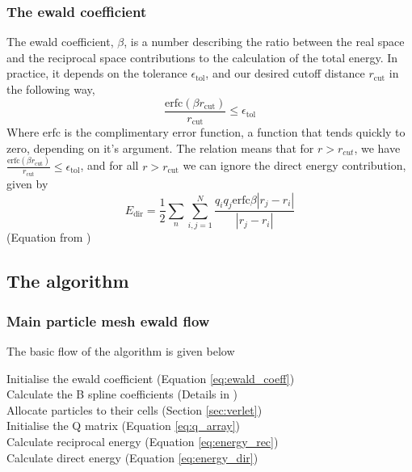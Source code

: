 \documentclass[pdftex,twoside,a4paper]{report}
\begin{document}
\subsubsection{The ewald coefficient}
The ewald coefficient, $\beta$, is a number describing the ratio between the real space and the reciprocal space contributions to the calculation of the total energy. In practice, it depends on the tolerance $\epsilon_\text{tol}$, and our desired cutoff distance $r_{\text{cut}}$ in the following way, \cite{darden:10089} \cite{essmann:8577}\\
\begin{equation}
\frac{\text{erfc}(\beta r_{\text{cut}})}{r_\text{cut}} \leq \epsilon_\text{tol}
\label{eq:ewald_coeff}
\end{equation}
Where erfc is the complimentary error function, a function that tends quickly to zero, depending on it's argument. The relation means that for $r > r_{cut}$, we have $\frac{\text{erfc}(\beta r_{\text{cut}})}{r_\text{cut}} \leq \epsilon_\text{tol}$, and for all $r > r_\text{cut}$ we can ignore the direct energy contribution, given by\\
\begin{equation}
E_\text{dir} = \frac{1}{2} \sum_{n} \sum_{i,j = 1} ^N \frac{q_i q_j \text{erfc}{\beta |r_j - r_i|}}{|r_j - r_i|}
\label{eq:energy_dir}
\end{equation}
(Equation from  \cite{essmann:8577})
\subsection{The algorithm}
\subsubsection{Main particle mesh ewald flow}
The basic flow of the algorithm is given below\\ \newline
\begin{algorithm}[H]
\SetLine
Initialise the ewald coefficient (Equation \ref{eq:ewald_coeff})\\
Calculate the B spline coefficients (Details in \cite{essmann:8577})\\
Allocate particles to their cells (Section \ref{sec:verlet})\\
Initialise the Q matrix (Equation \ref{eq:q_array})\\
Calculate reciprocal energy (Equation \ref{eq:energy_rec})\\
Calculate direct energy (Equation \ref{eq:energy_dir})\\
\end{algorithm}
\end{document}

